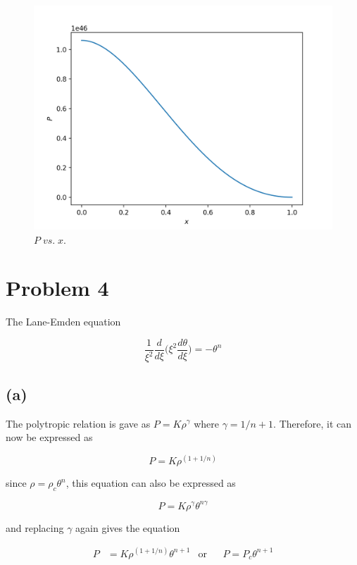 \documentclass[11pt]{article}
\begin{document}
\begin{figure}[htp]
    \centering
    \includegraphics[width=15cm]{Figure_1.png}
    \caption{$P \; vs. \; x$.}
    \label{fig:img}
\end{figure}

\clearpage


\section*{Problem 4}

The Lane-Emden equation

$$
\frac{1}{\xi^{2}} \frac{d}{d\xi} \Bigg( \xi^{2} \frac{d \theta}{d \xi} \Bigg) = -\theta^{n}
$$

\subsection*{(a)}

The polytropic relation is gave as $P = K\rho^{\gamma}$ where $\gamma = 1/n + 1$. Therefore, it can now be expressed as

$$
P = K\rho^{(1 + 1/n)}
$$

since $\rho = \rho_{c} \theta^{n}$, this equation can also be expressed as 

$$
P = K\rho^{\gamma} \theta^{n \gamma}
$$

and replacing $\gamma$ again gives the equation 

\begin{align*}
P &= K\rho^{(1 + 1/n)} \theta^{n + 1} & \text{or} && P = P_{c} \theta^{n + 1}
\end{align*}
\end{document}
